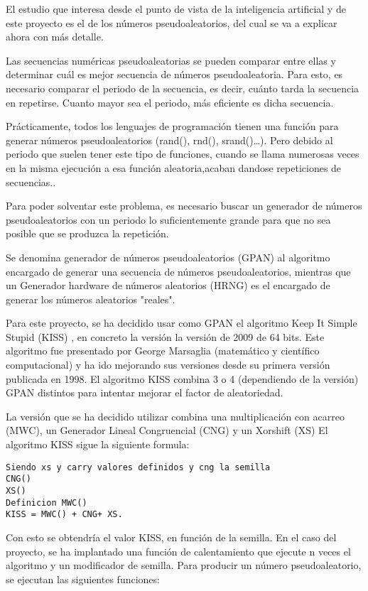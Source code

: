 El estudio que interesa desde el punto de vista de la inteligencia artificial y de este proyecto es el de los números pseudoaleatorios, del cual se va a explicar ahora con más detalle.

Las secuencias numéricas pseudoaleatorias se pueden comparar entre ellas y determinar cuál es mejor secuencia de números pseudoaleatoria. Para esto, es necesario comparar el periodo de la secuencia, es decir, cuánto tarda la secuencia en repetirse. Cuanto mayor sea el periodo, más eficiente es dicha secuencia.

Prácticamente, todos los lenguajes de programación tienen una función para generar números pseudoaleatorios (rand(), rnd(), srand()…). Pero debido  al periodo que suelen tener este tipo de funciones, cuando se llama numerosas veces en la misma ejecución a esa función aleatoria,acaban dandose repeticiones de secuencias.\cite{rand}. 

Para poder solventar este problema, es necesario buscar un generador de números pseudoaleatorios con un periodo lo suficientemente grande para que no sea posible que se produzca la repetición.

Se denomina generador de números pseudoaleatorios (GPAN) al algoritmo encargado de generar una secuencia de números pseudoaleatorios, mientras que un Generador hardware de números aleatorios (HRNG) es el encargado de generar los números aleatorios "reales".

Para este proyecto, se ha decidido usar como GPAN el algoritmo Keep It Simple Stupid (KISS) , en concreto la versión la versión de 2009 de 64 bits. Este algoritmo fue presentado por George Marsaglia (matemático y científico computacional) y ha ido mejorando sus versiones desde su primera versión publicada en 1998. El algoritmo KISS combina 3 o 4 (dependiendo de la versión) GPAN distintos para intentar mejorar el factor de aleatoriedad.

La versión que se ha decidido utilizar combina una multiplicación con acarreo (MWC), un Generador Lineal Congruencial (CNG) y un Xorshift (XS) El algoritmo KISS sigue la siguiente formula:\cite{kiss2,kiss1}

\begin{verbatim}
Siendo xs y carry valores definidos y cng la semilla
CNG()
XS()
Definicion MWC()
KISS = MWC() + CNG+ XS.
\end{verbatim}

Con esto se obtendría el valor KISS, en función de la semilla. En el caso del proyecto, se ha implantado una función de calentamiento que ejecute n veces el algoritmo y un modificador de semilla.
Para producir un número pseudoaleatorio, se ejecutan las siguientes funciones:

